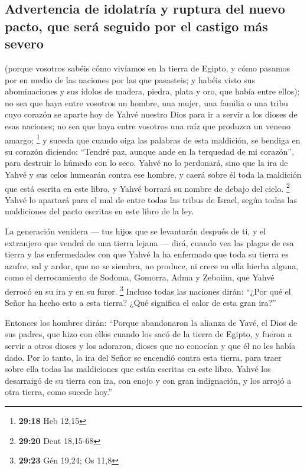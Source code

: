 \hypertarget{advertencia-de-idolatruxeda-y-ruptura-del-nuevo-pacto-que-seruxe1-seguido-por-el-castigo-muxe1s-severo}{%
\subsection{Advertencia de idolatría y ruptura del nuevo pacto, que será
seguido por el castigo más
severo}\label{advertencia-de-idolatruxeda-y-ruptura-del-nuevo-pacto-que-seruxe1-seguido-por-el-castigo-muxe1s-severo}}

 (porque vosotros sabéis cómo vivíamos en la tierra de
Egipto, y cómo pasamos por en medio de las naciones por las que
pasasteis;  y habéis visto sus abominaciones y sus ídolos
de madera, piedra, plata y oro, que había entre ellos); 
no sea que haya entre vosotros un hombre, una mujer, una familia o una
tribu cuyo corazón se aparte hoy de Yahvé nuestro Dios para ir a servir
a los dioses de esas naciones; no sea que haya entre vosotros una raíz
que produzca un veneno amargo; \footnote{\textbf{29:18} Heb 12,15}
 y suceda que cuando oiga las palabras de esta maldición,
se bendiga en su corazón diciendo: ``Tendré paz, aunque ande en la
terquedad de mi corazón'', para destruir lo húmedo con lo seco.
 Yahvé no lo perdonará, sino que la ira de Yahvé y sus
celos humearán contra ese hombre, y caerá sobre él toda la maldición que
está escrita en este libro, y Yahvé borrará su nombre de debajo del
cielo. \footnote{\textbf{29:20} Deut 18,15-68}  Yahvé lo
apartará para el mal de entre todas las tribus de Israel, según todas
las maldiciones del pacto escritas en este libro de la ley.

 La generación venidera --- tus hijos que se levantarán
después de ti, y el extranjero que vendrá de una tierra lejana --- dirá,
cuando vea las plagas de esa tierra y las enfermedades con que Yahvé la
ha enfermado  que toda su tierra es azufre, sal y ardor,
que no se siembra, no produce, ni crece en ella hierba alguna, como el
derrocamiento de Sodoma, Gomorra, Adma y Zeboiim, que Yahvé derrocó en
su ira y en su furor. \footnote{\textbf{29:23} Gén 19,24; Os 11,8}
 Incluso todas las naciones dirán: ``¿Por qué el Señor ha
hecho esto a esta tierra? ¿Qué significa el calor de esta gran ira?''

 Entonces los hombres dirán: ``Porque abandonaron la
alianza de Yavé, el Dios de sus padres, que hizo con ellos cuando los
sacó de la tierra de Egipto,  y fueron a servir a otros
dioses y los adoraron, dioses que no conocían y que él no les había
dado.  Por lo tanto, la ira del Señor se encendió contra
esta tierra, para traer sobre ella todas las maldiciones que están
escritas en este libro.  Yahvé los desarraigó de su
tierra con ira, con enojo y con gran indignación, y los arrojó a otra
tierra, como sucede hoy.''

